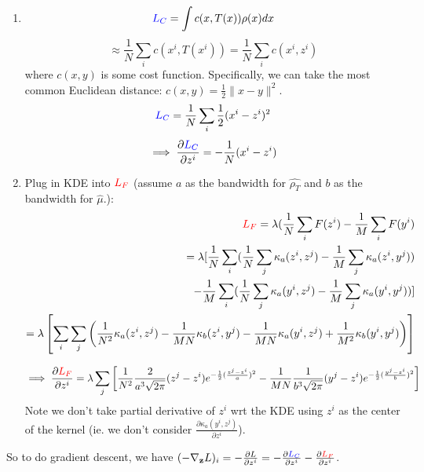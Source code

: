 \documentclass[11pt]{article}
\begin{document}
\begin{enumerate}
    \begin{enumerate}
        \item 
        $$
        \textcolor{blue}{L_C} = \int c(x,T(x)) \rho(x) dx
        $$
        $$
        \approx \frac{1}{N} \sum_i c(x^i,T(x^i))
        = \frac{1}{N} \sum_i c(x^i,z^i)
        $$
        where $c(x,y)$ is some cost function. Specifically, we can take the most common Euclidean distance: $c(x,y) = \frac{1}{2} \|x-y\|^2$.
        $$
        \textcolor{blue}{L_C} = \frac{1}{N} \sum_i \frac{1}{2}(x^i-z^i)^2
        $$
        \begin{align*}
            \implies \frac{\partial \textcolor{blue}{L_C}}{\partial z^i}
            = - \frac{1}{N}(x^i-z^i)
        \end{align*}
        
        \item Plug in KDE into $\textcolor{red}{L_F}$ (assume $a$ as the bandwidth for $\hat{\rho_T}$ and $b$ as the bandwidth for $\hat{\mu}$.):
        \begin{align*}
            \textcolor{red}{L_F} = \lambda (\frac{1}{N} \sum_i F(z^i) - \frac{1}{M} \sum_i F(y^i)\\
            =  \lambda [\frac{1}{N} \sum_i (\frac{1}{N} \sum_j \kappa_a(z^i,z^j) - \frac{1}{M} \sum_j \kappa_a(z^i,y^j))\\
            - \frac{1}{M} \sum_i (\frac{1}{N} \sum_j \kappa_a(y^i,z^j) - \frac{1}{M} \sum_j \kappa_a(y^i,y^j))]\\
            = \lambda \left[\sum_i \sum_j \left( 
            \frac{1}{N^2}\kappa_a(z^i,z^j) -  \frac{1}{MN}\kappa_b(z^i,y^j) -   \frac{1}{MN}\kappa_a(y^i,z^j) +  \frac{1}{M^2}\kappa_b(y^i,y^j)
            \right) \right]
        \end{align*}
        
        \begin{align*}
            \implies \frac{\partial \textcolor{red}{L_F}}{\partial z^i}
            = \lambda \sum_j \left[
             \frac{1}{N^2}\frac{2}{a^3\sqrt{2\pi}} (z^j-z^i) e^{-\frac{1}{2}(\frac{z^j-z^i}{a})^2} -  \frac{1}{MN}\frac{1}{b^3\sqrt{2\pi}} (y^j-z^i) e^{-\frac{1}{2}(\frac{y^j-z^i}{b})^2} \right]
        \end{align*}
        Note we don't take partial derivative of $z^i$ wrt the KDE using $z^i$ as the center of the kernel (ie. we don't consider $\frac{\partial \kappa_a(y^i,z^j)}{\partial z^i}$).
        \end{enumerate}
    
    So to do gradient descent, we have $(-\nabla_{\mathbf{z}} L)_i =  -\frac{\partial L}{\partial z^i} = -  \frac{\partial \textcolor{blue}{L_C}}{\partial z^i} -  \frac{\partial \textcolor{red}{L_F}}{\partial z^i}$.
    
\end{enumerate}
\end{document}
